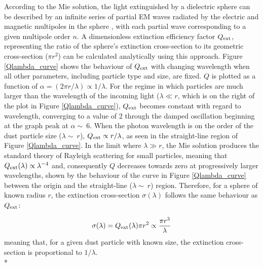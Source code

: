 \documentclass[12pt, a4paper]{report}
\begin{document}
According to the Mie solution, the light extinguished by a dielectric sphere can be described by an infinite series of partial EM waves radiated by the electric and magnetic multipoles in the sphere \citep{Grainger:04}, with each partial wave corresponding to a given multipole order $n$. A dimensionless extinction efficiency factor $Q_{\textnormal{ext}}$, representing the ratio of the sphere's extinction cross-section to its geometric cross-section ($\pi r^{2}$) can be calculated analytically using this approach. Figure \ref{Qlambda_curve} shows the behaviour of $Q_{\textnormal{ext}}$ with changing wavelength when all other parameters, including particle type and size, are fixed. $Q$ is plotted as a function of $\alpha = (2\pi r/\lambda) \propto 1/\lambda$. For the regime in which particles are much larger than the wavelength of the incoming light ($\lambda \ll r$, which is on the right of the plot in Figure \ref{Qlambda_curve}), $Q_{\textnormal{ext}}$ becomes constant with regard to wavelength, converging to a value of 2 through the damped oscillation beginning at the graph peak at $\alpha \sim\ 6$. When the photon wavelength is on the order of the dust particle size ($\lambda \sim\ r$),  $Q_{\textnormal{ext}} \propto r/\lambda$, as seen in the straight-line region of Figure \ref{Qlambda_curve}. In the limit where $\lambda \gg r$, the Mie solution produces the standard theory of Rayleigh scattering for small particles, meaning that $Q_{\textnormal{ext}}(\lambda) \propto \lambda^{-4}$ and, consequently $Q$ decreases towards zero at progressively larger wavelengths, shown by the behaviour of the curve in Figure \ref{Qlambda_curve} between the origin and the straight-line ($\lambda \sim\ r$) region. Therefore, for a sphere of known radius $r$, the extinction cross-section $\sigma(\lambda)$ follows the
same behaviour as $Q_{\textnormal{ext}}$:
 
\begin{equation}
\sigma(\lambda) = Q_{\textnormal{ext}}(\lambda){\pi r^{2}} \propto \frac{\pi r^{3}}{\lambda}
\label{x_section_wavelength}
\end{equation}
meaning that, for a given dust particle with known size, the extinction cross-section is proportional to $1/\lambda$. \\*
\end{document}
